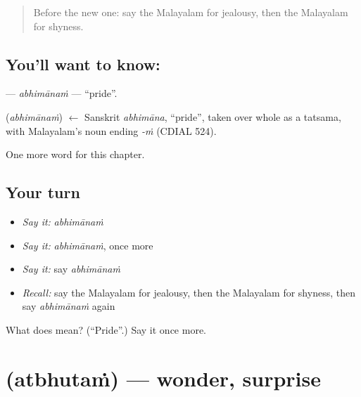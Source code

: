 \label{lesson:ML-C193-abhimanam}



\begin{quote}
Before the new one: say the Malayalam for jealousy, then the Malayalam for shyness.
\end{quote}

\subsection*{You'll want to know: }
\textbf{} — \emph{abhimānaṁ} — \textquotedblleft{}pride\textquotedblright{}.

\begin{cousinweb}
\textbf{} (\emph{abhimānaṁ}) $\leftarrow$ Sanskrit \emph{abhimāna}, \textquotedblleft{}pride\textquotedblright{}, taken over whole as a tatsama, with Malayalam's noun ending \emph{-ṁ} (CDIAL 524).
\end{cousinweb}

\begin{grammarlens}[title={What you've built}]
One more word for this chapter.
\end{grammarlens}

\subsection*{Your turn}
\begin{itemize}
\raggedright
  \item \emph{Say it:} \emph{abhimānaṁ}
  \item \emph{Say it:} \emph{abhimānaṁ}, once more
  \item \emph{Say it:} say \emph{abhimānaṁ}
  \item \emph{Recall:} say the Malayalam for jealousy, then the Malayalam for shyness, then say \emph{abhimānaṁ} again
\end{itemize}

\begin{tcolorbox}[breakable,colback=teal!4,colframe=teal!35!black,title={Before you move on}]
What does  mean? (\textquotedblleft{}Pride\textquotedblright{}.) Say it once more.
\end{tcolorbox}
\section[\texorpdfstring{\ml{അത്ഭുതം} (atbhutaṁ)}{അത്ഭുതം (atbhutaṁ)}]{ (atbhutaṁ) — wonder, surprise}

